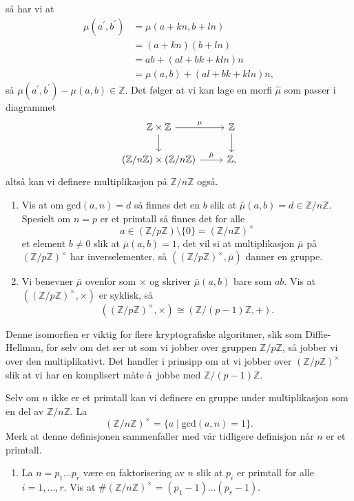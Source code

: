 så har vi at
\[\begin{aligned}
    \mu(a^\prime, b^\prime)
    &= \mu(a + kn, b + ln)
    \\
    &= (a + kn)(b + ln)
    \\
    &= ab + (al + bk + kln)n
    \\
    &= \mu(a, b) + (al + bk + kln)n,
\end{aligned}\]
så $\mu(a^\prime, b^\prime) - \mu(a, b) \in \mathbb Z$.
Det følger at vi kan lage en morfi $\hat\mu$ som passer i diagrammet
\[\begin{tikzcd}
    \mathbb Z\times \mathbb Z
    \rar{\mu}
    \dar
    &
    \mathbb Z
    \dar
    \\
    (\mathbb Z / n\mathbb Z)\times(\mathbb Z / n\mathbb Z)
    \rar{\hat\mu}
    &
    \mathbb Z,
\end{tikzcd}\]
altså kan vi definere multiplikasjon på $\mathbb Z / n\mathbb Z$ også.
\begin{enumerate}[resume]
    \item Vis at om $\mathrm{gcd}(a, n) = d$ så finnes det en
        $b$ slik at $\bar\mu(a, b) = d\in \mathbb Z / n\mathbb Z$.
        Spesielt om $n = p$ er et primtall så finnes det for alle
        \[
            a \in (\mathbb Z / p\mathbb Z)\setminus\{0\}
            = {(\mathbb Z / n\mathbb Z)}^\times
        \]
        et element $b\neq 0$ slik at $\overline\mu(a, b) = 1$,
        det vil si at multiplikasjon $\bar\mu$ på
        ${(\mathbb Z / p\mathbb Z)}^\times$ har inverselementer,
        så $({(\mathbb Z / p\mathbb Z)}^\times, \bar\mu)$ danner en gruppe.
    \item Vi benevner $\bar\mu$ ovenfor som $\times$ og skriver
        $\bar\mu(a,b)$ bare som $ab$.
        Vis at $({(\mathbb Z / p\mathbb Z)}^\times, \times)$ er syklisk,
        så
        \[
            ({(\mathbb Z / p\mathbb Z)}^\times, \times)
            \cong (\mathbb Z / (p - 1)\mathbb Z, +).
        \]
\end{enumerate}
\begin{remark}
    Denne isomorfien er viktig for flere kryptografiske algoritmer,
    slik som Diffie-Hellman,
    for selv om det ser ut som vi jobber over gruppen $\mathbb Z / p\mathbb Z$,
    så jobber vi over den multiplikativt.
    Det handler i prinsipp om at vi jobber over ${(\mathbb Z / p\mathbb Z)}^\times$
    slik at vi har en komplisert måte å jobbe med $\mathbb Z / (p - 1)\mathbb Z$.
\end{remark}

Selv om $n$ ikke er et primtall kan vi definere en gruppe under multiplikasjon
som en del av $\mathbb Z / n\mathbb Z$.
La
\[
    {(\mathbb Z / n\mathbb Z)}^\times
    = \{ a\mid \mathrm{gcd}(a, n) = 1\}.
\]
Merk at denne definisjonen sammenfaller med vår
tidligere definisjon når $n$ er et primtall.
\begin{enumerate}[resume]
    \item La $n = p_1\dots p_r$ være en faktorisering av $n$
        slik at $p_i$ er primtall for alle $i=1,\dots,r$.
        Vis at $\# {(\mathbb Z / n\mathbb Z)}^\times = (p_1 - 1)\dots(p_r - 1)$.
\end{enumerate}

